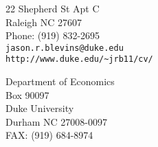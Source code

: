 \documentclass[margin,line,11pt,draft]{res}
\begin{document}


\begin{resume}

\hspace{-0cm}
\begin{minipage}{1.25\linewidth}
  \begin{minipage}{0.49\linewidth}
    22 Shepherd St Apt C \\
    Raleigh NC 27607 \\
    Phone: (919) 832-2695 \\
    {\tt jason.r.blevins@duke.edu} \\
    {\tt \verb+http://www.duke.edu/~jrb11/cv/+} \\
  \end{minipage}
  \hspace{\fill}
  \begin{minipage}{0.49\linewidth}
    Department of Economics\\
    Box 90097 \\
    Duke University \\
    Durham NC 27008-0097 \\
    FAX: (919) 684-8974  \\
  \end{minipage}
\end{minipage}


\end{resume}
\end{document}
